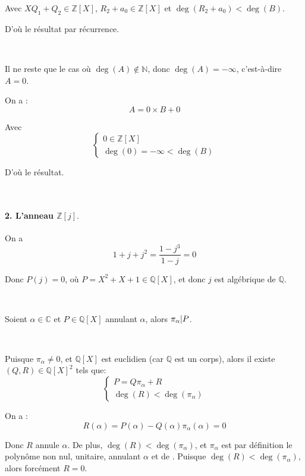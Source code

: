 Avec $X Q_1 + Q_2 \in \mathbb{Z} [X]$, $R_2 + a_0 \in \mathbb{Z} [X]$ et $\deg
(R_2 + a_0) < \deg (B)$.

D'o{\`u} le r{\'e}sultat par r{\'e}currence.

\

Il ne reste que le cas o{\`u} $\deg (A) \nin \mathbb{N}$, donc $\deg (A) = -
\infty$, c'est-{\`a}-dire $A = 0$.

On a :
\[ A = 0 \times B + 0 \]


Avec
\[ \left\{\begin{array}{l}
     0 \in \mathbb{Z} [X]\\
     \deg (0) = - \infty < \deg (B)
   \end{array}\right. \]


D'o{\`u} le r{\'e}sultat.

\

\paragraph{2. L'anneau $\mathbb{Z} [j] .$}

 On a
\[ 1 + j + j^2 = \frac{1 - j^3}{1 - j} = 0 \]


Donc $P (j) = 0$, o{\`u} $P = X^2 + X + 1 \in \mathbb{Q} [X]$, et donc $j$ est
alg{\'e}brique de $\mathbb{Q}$.

\



Soient $\alpha \in \mathbb{C}$ et $P \in \mathbb{Q} [X]$ annulant $\alpha$,
alors $\pi_{\alpha} | P $.

\


Puisque $\pi_{\alpha} \neq 0$, et $\mathbb{Q} [X]$ est euclidien (car
$\mathbb{Q}$ est un corps), alors il existe $(Q, R) \in \mathbb{Q} [X]^2$ tels
que:
\[ \left\{\begin{array}{l}
     P = Q \pi_{\alpha} + R\\
     \deg (R) < \deg (\pi_{\alpha})
   \end{array}\right. \]


On a :
\[ R (\alpha) = P (\alpha) - Q (\alpha) \pi_{\alpha} (\alpha) = 0 \]


Donc $R$ annule $\alpha$. De plus, $\deg (R) < \deg (\pi_{\alpha})$, et
$\pi_{\alpha}$ est par d{\'e}finition le polyn{\^o}me non nul, unitaire,
annulant $\alpha$ et de . Puisque $\deg (R) < \deg
(\pi_{\alpha})$, alors forc{\'e}ment $R = 0$.

